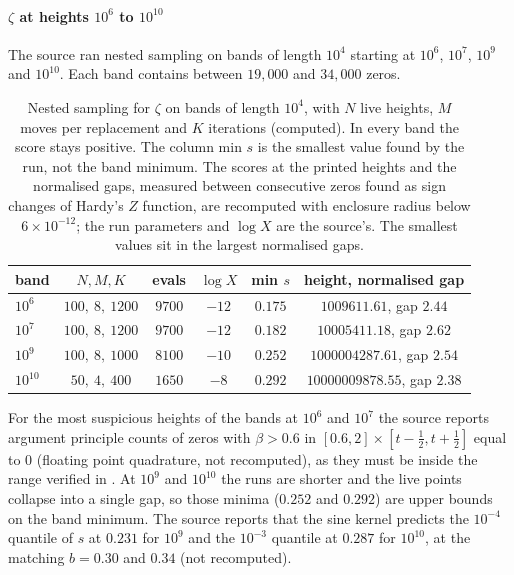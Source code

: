 \paragraph{$\zeta$ at heights $10^6$ to $10^{10}$} The source ran nested sampling on bands of length $10^4$ starting at $10^6$, $10^7$, $10^9$ and $10^{10}$. Each band contains between $19{,}000$ and $34{,}000$ zeros.

\begin{table}[h]
\centering
\small\begin{tabular}{lccccc}
\toprule
band & $N,M,K$ & evals & $\log X$ & min $s$ & height, normalised gap\\
\midrule
$10^6$ & $100,\ 8,\ 1200$ & $9700$ & $-12$ & $0.175$ & $1009611.61$, gap $2.44$\\
$10^7$ & $100,\ 8,\ 1200$ & $9700$ & $-12$ & $0.182$ & $10005411.18$, gap $2.62$\\
$10^9$ & $100,\ 8,\ 1000$ & $8100$ & $-10$ & $0.252$ & $1000004287.61$, gap $2.54$\\
$10^{10}$ & $50,\ 4,\ 400$ & $1650$ & $-8$ & $0.292$ & $10000009878.55$, gap $2.38$\\
\bottomrule
\end{tabular}
\caption{Nested sampling for $\zeta$ on bands of length $10^4$, with $N$ live heights, $M$ moves per replacement and $K$ iterations (computed). In every band the score stays positive. The column min $s$ is the smallest value found by the run, not the band minimum. The scores at the printed heights and the normalised gaps, measured between consecutive zeros found as sign changes of Hardy's $Z$ function, are recomputed with enclosure radius below $6\times10^{-12}$; the run parameters and $\log X$ are the source's. The smallest values sit in the largest normalised gaps.}
\label{cf:tab:ns}
\end{table}

For the most suspicious heights of the bands at $10^6$ and $10^7$ the source reports argument principle counts of zeros with $\beta>0.6$ in $[0.6,2]\times[t-\frac12,t+\frac12]$ equal to $0$ (floating point quadrature, not recomputed), as they must be inside the range verified in \cite{PT21}. At $10^9$ and $10^{10}$ the runs are shorter and the live points collapse into a single gap, so those minima ($0.252$ and $0.292$) are upper bounds on the band minimum. The source reports that the sine kernel predicts the $10^{-4}$ quantile of $s$ at $0.231$ for $10^9$ and the $10^{-3}$ quantile at $0.287$ for $10^{10}$, at the matching $b=0.30$ and $0.34$ (not recomputed).

